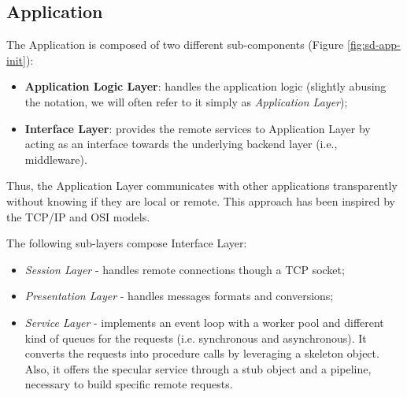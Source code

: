 \subsection{Application}
The Application is composed of two different sub-components (Figure
\ref{fig:sd-app-init}):

\begin{itemize}
  \item \textbf{Application Logic Layer}: handles the application logic
    (slightly abusing the notation, we will often refer to it simply as
    \textit{Application Layer});
  \item \textbf{Interface Layer}: provides the remote services to Application
    Layer by acting as an interface towards the underlying backend layer (i.e.,
    middleware).
\end{itemize}

Thus, the Application Layer communicates with
other applications transparently without knowing if they are local or remote.
This approach has been inspired by the TCP/IP and OSI models.

The following sub-layers compose Interface Layer:

\begin{itemize}
	\item \textit{Session Layer} -
	handles remote connections though a TCP socket;
	\item \textit{Presentation Layer} -
	handles messages formats and conversions;
	\item \textit{Service Layer} -
	implements an event loop with a worker pool and different kind of queues
	for the requests (i.e. synchronous and asynchronous). It converts the
	requests into procedure calls by leveraging a skeleton object.
	Also, it offers the specular service through a stub object and a pipeline,
	necessary to build specific remote requests.
\end{itemize}




